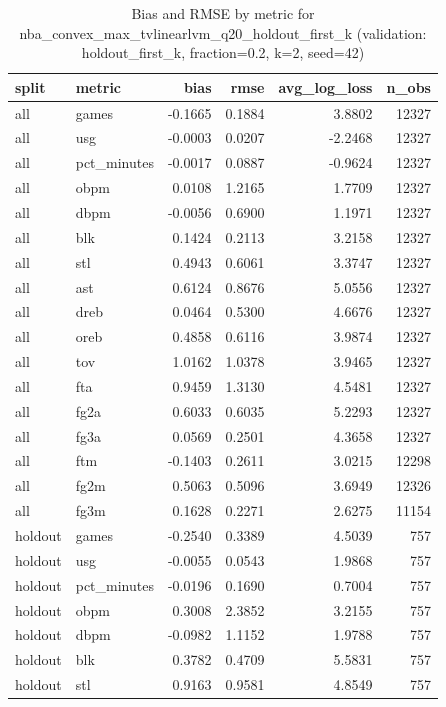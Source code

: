 \begin{table}
\caption{Bias and RMSE by metric for nba_convex_max_tvlinearlvm_q20_holdout_first_k (validation: holdout_first_k, fraction=0.2, k=2, seed=42)}
\label{tab:nba_convex_max_tvlinearlvm_q20_holdout_first_k_vs_holdout_first_k_f20_k2_s42_bias_rmse}
\begin{tabular}{llrrrr}
\toprule
split & metric & bias & rmse & avg\_log\_loss & n\_obs \\
\midrule
all & games & -0.1665 & 0.1884 & 3.8802 & 12327 \\
all & usg & -0.0003 & 0.0207 & -2.2468 & 12327 \\
all & pct\_minutes & -0.0017 & 0.0887 & -0.9624 & 12327 \\
all & obpm & 0.0108 & 1.2165 & 1.7709 & 12327 \\
all & dbpm & -0.0056 & 0.6900 & 1.1971 & 12327 \\
all & blk & 0.1424 & 0.2113 & 3.2158 & 12327 \\
all & stl & 0.4943 & 0.6061 & 3.3747 & 12327 \\
all & ast & 0.6124 & 0.8676 & 5.0556 & 12327 \\
all & dreb & 0.0464 & 0.5300 & 4.6676 & 12327 \\
all & oreb & 0.4858 & 0.6116 & 3.9874 & 12327 \\
all & tov & 1.0162 & 1.0378 & 3.9465 & 12327 \\
all & fta & 0.9459 & 1.3130 & 4.5481 & 12327 \\
all & fg2a & 0.6033 & 0.6035 & 5.2293 & 12327 \\
all & fg3a & 0.0569 & 0.2501 & 4.3658 & 12327 \\
all & ftm & -0.1403 & 0.2611 & 3.0215 & 12298 \\
all & fg2m & 0.5063 & 0.5096 & 3.6949 & 12326 \\
all & fg3m & 0.1628 & 0.2271 & 2.6275 & 11154 \\
holdout & games & -0.2540 & 0.3389 & 4.5039 & 757 \\
holdout & usg & -0.0055 & 0.0543 & 1.9868 & 757 \\
holdout & pct\_minutes & -0.0196 & 0.1690 & 0.7004 & 757 \\
holdout & obpm & 0.3008 & 2.3852 & 3.2155 & 757 \\
holdout & dbpm & -0.0982 & 1.1152 & 1.9788 & 757 \\
holdout & blk & 0.3782 & 0.4709 & 5.5831 & 757 \\
holdout & stl & 0.9163 & 0.9581 & 4.8549 & 757 \\

\end{tabular}
\end{table}
